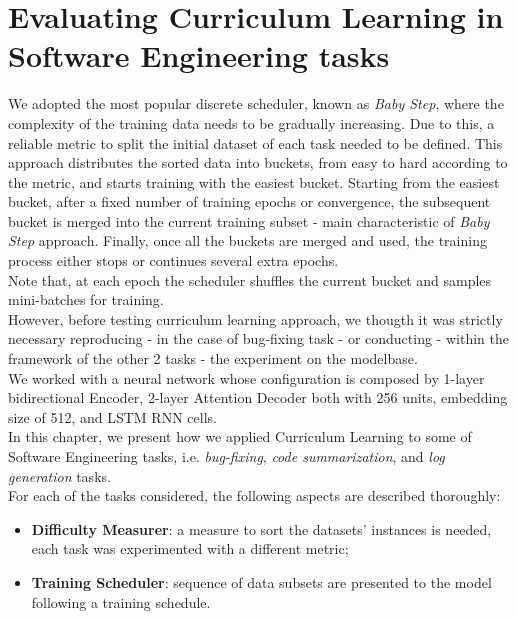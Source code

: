 \chapter{Evaluating Curriculum Learning in Software Engineering tasks}


We adopted the most popular discrete scheduler, known as \textit{Baby Step}, where the complexity of the training
data needs to be gradually increasing. Due to this, a reliable metric to split the initial dataset of each task needed to be defined.
This approach distributes the sorted data into buckets, from easy to hard according to the metric, and starts training with the easiest bucket. 
Starting from the easiest bucket, after a fixed number of training epochs or convergence, the subsequent bucket is merged
into the current training subset - main characteristic of \textit{Baby Step} approach.
Finally, once all the buckets are merged and used, the
training process either stops or continues several extra epochs.\\
Note that, at each epoch the scheduler shuffles the current bucket and samples mini-batches for training.\\

However, before testing curriculum learning approach, we thougth it was strictly necessary reproducing - in the case 
of bug-fixing task - or conducting -  within the framework of the other 2 tasks - the experiment on the modelbase.\\
We worked with a neural network whose configuration is composed by 1-layer bidirectional Encoder, 2-layer Attention 
Decoder both with 256 units, embedding size of 512, and LSTM RNN cells.\\

In this chapter, we present how we applied Curriculum Learning to some of Software
Engineering tasks, i.e. \textit{bug-fixing}, \textit{code summarization}, and \textit{log generation}
tasks. \\
For each of the tasks considered, the following aspects are described thoroughly:
\begin{itemize}
    \item \textbf{Difficulty Measurer}: a measure to sort the datasets' instances is needed, each task was experimented with a different metric; 
    \item \textbf{Training Scheduler}: sequence of data subsets are presented to the model following a training schedule.
\end{itemize}


